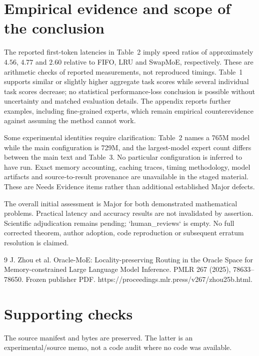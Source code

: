 \documentclass[10pt]{article}
\begin{document}
\section*{Empirical evidence and scope of the conclusion}
The reported first-token latencies in Table 2 imply speed ratios of approximately \(4.56\), \(4.77\) and \(2.60\) relative to FIFO, LRU and SwapMoE, respectively. These are arithmetic checks of reported measurements, not reproduced timings. Table 1 supports similar or slightly higher aggregate task scores while several individual task scores decrease; no statistical performance-loss conclusion is possible without uncertainty and matched evaluation details. The appendix reports further examples, including fine-grained experts, which remain empirical counterevidence against assuming the method cannot work.\par
Some experimental identities require clarification: Table 2 names a 765M model while the main configuration is 729M, and the largest-model expert count differs between the main text and Table 3. No particular configuration is inferred to have run. Exact memory accounting, caching traces, timing methodology, model artifacts and source-to-result provenance are unavailable in the staged material. These are Needs Evidence items rather than additional established Major defects.\par
The overall initial assessment is Major for both demonstrated mathematical problems. Practical latency and accuracy results are not invalidated by assertion. Scientific adjudication remains pending; `human\_reviews` is empty. No full corrected theorem, author adoption, code reproduction or subsequent erratum resolution is claimed.\par
9 J. Zhou et al. Oracle-MoE: Locality-preserving Routing in the Oracle Space for Memory-constrained Large Language Model Inference. PMLR 267 (2025), 78633–78650. Frozen publisher PDF. https://proceedings.mlr.press/v267/zhou25b.html.\par
\section*{Supporting checks}
The source manifest and bytes are preserved. The latter is an experimental/source memo, not a code audit where no code was available.\par
\end{document}
